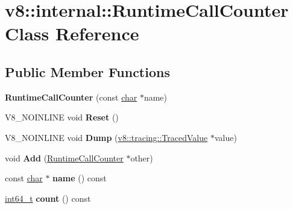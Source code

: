 \hypertarget{classv8_1_1internal_1_1RuntimeCallCounter}{}\section{v8\+:\+:internal\+:\+:Runtime\+Call\+Counter Class Reference}
\label{classv8_1_1internal_1_1RuntimeCallCounter}
\subsection*{Public Member Functions}
\begin{DoxyCompactItemize}
\item 
\mbox{\label{classv8_1_1internal_1_1RuntimeCallCounter_ae6fd918d026a8906f964a0c35c000634}} 
{\bfseries Runtime\+Call\+Counter} (const \mbox{\hyperlink{classchar}{char}} $\ast$name)
\item 
\mbox{\label{classv8_1_1internal_1_1RuntimeCallCounter_aaf750c3b15af87b2af841f75dbaa46c9}} 
V8\+\_\+\+N\+O\+I\+N\+L\+I\+NE void {\bfseries Reset} ()
\item 
\mbox{\label{classv8_1_1internal_1_1RuntimeCallCounter_ac978b473b5542a9b0ab654995eac681c}} 
V8\+\_\+\+N\+O\+I\+N\+L\+I\+NE void {\bfseries Dump} (\mbox{\hyperlink{classv8_1_1tracing_1_1TracedValue}{v8\+::tracing\+::\+Traced\+Value}} $\ast$value)
\item 
\mbox{\label{classv8_1_1internal_1_1RuntimeCallCounter_a8e1fda9c575d7f6d1cd346ae0e955f5d}} 
void {\bfseries Add} (\mbox{\hyperlink{classv8_1_1internal_1_1RuntimeCallCounter}{Runtime\+Call\+Counter}} $\ast$other)
\item 
\mbox{\label{classv8_1_1internal_1_1RuntimeCallCounter_a034316a1effc903cfdc879346120aec5}} 
const \mbox{\hyperlink{classchar}{char}} $\ast$ {\bfseries name} () const
\item 
\mbox{\label{classv8_1_1internal_1_1RuntimeCallCounter_ae5e6920c0135add28d04027b34923536}} 
\mbox{\hyperlink{classint64__t}{int64\+\_\+t}} {\bfseries count} () const

\end{DoxyCompactItemize}
